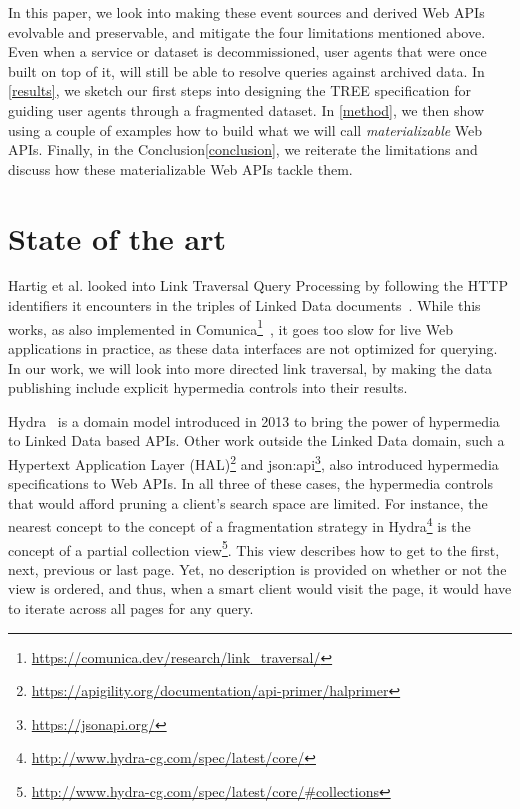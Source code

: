 \documentclass[
]{ceurart}
\begin{document}
In this paper, we look into making these event sources and derived Web APIs evolvable and preservable, and mitigate the four limitations mentioned above.
Even when a service or dataset is decommissioned, user agents that were once built on top of it, will still be able to resolve queries against archived data.
In \cref{results}, we sketch our first steps into designing the TREE specification for guiding user agents through a fragmented dataset.
In \cref{method}, we then show using a couple of examples how to build what we will call \textit{materializable} Web APIs.
Finally, in the Conclusion\cref{conclusion}, we reiterate the limitations and discuss how these materializable Web APIs tackle them.

\section{State of the art}
\label{sec:sota}
Hartig et al. looked into Link Traversal Query Processing by following the HTTP identifiers it encounters in the triples of Linked Data documents~\cite{hartig2009executing}.
While this works, as also implemented in Comunica\footnote{\url{https://comunica.dev/research/link_traversal/}}~\cite{taelman_iswc_resources_comunica_2018}, it goes too slow for live Web applications in practice, as these data interfaces are not optimized for querying.
In our work, we will look into more directed link traversal, by making the data publishing include explicit hypermedia controls into their results.

Hydra~\cite{lanthaler2013creating} is a domain model introduced in 2013 to bring the power of hypermedia to Linked Data based APIs.
Other work outside the Linked Data domain, such a Hypertext Application Layer (HAL)\footnote{\url{https://apigility.org/documentation/api-primer/halprimer}} and json:api\footnote{\url{https://jsonapi.org/}}, also introduced hypermedia specifications to Web APIs.
In all three of these cases, the hypermedia controls that would afford pruning a client’s search space are limited.
For instance, the nearest concept to the concept of a fragmentation strategy in Hydra\footnote{\url{http://www.hydra-cg.com/spec/latest/core/}} is the concept of a partial collection view\footnote{\url{http://www.hydra-cg.com/spec/latest/core/#collections}}.
This view describes how to get to the first, next, previous or last page.
Yet, no description is provided on whether or not the view is ordered, and thus, when a smart client would visit the page, it would have to iterate across all pages for any query.
\end{document}
